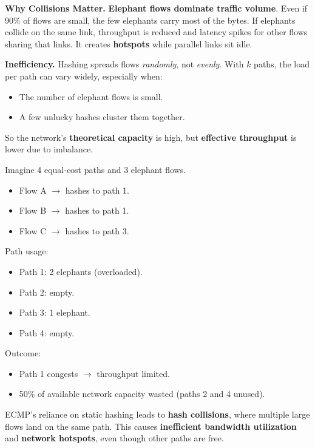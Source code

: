 \newpage

\noindent
\textcolor{Red2}{ \textbf{Why Collisions Matter.}} \textbf{Elephant flows dominate traffic volume}. Even if 90\% of flows are small, the few elephants carry most of the bytes. If elephants collide on the same link, throughput is reduced and latency spikes for other flows sharing that links. It creates \textbf{hotspots} while parallel links sit idle.

\highspace
\textcolor{Red2}{ \textbf{Inefficiency.}} Hashing spreads flows \emph{randomly}, not \emph{evenly}. With $k$ paths, the load per path can vary widely, especially when:
\begin{itemize}
    \item The number of elephant flows is small.
    \item A few unlucky hashes cluster them together.
\end{itemize}
So the network's \textbf{theoretical capacity} is high, but \textbf{effective throughput} is lower due to imbalance.

\begin{examplebox}
    Imagine 4 equal-cost paths and 3 elephant flows.
    \begin{itemize}
        \item Flow A $\rightarrow$ hashes to path 1.
        \item Flow B $\rightarrow$ hashes to path 1.
        \item Flow C $\rightarrow$ hashes to path 3.
    \end{itemize}
    Path usage:
    \begin{itemize}
        \item Path 1: 2 elephants (overloaded).
        \item Path 2: empty.
        \item Path 3: 1 elephant.
        \item Path 4: empty.
    \end{itemize}
    Outcome:
    \begin{itemize}
        \item Path 1 congests $\rightarrow$ throughput limited.
        \item 50\% of available network capacity wasted (paths 2 and 4 unused).
    \end{itemize}
\end{examplebox}

\noindent
ECMP's reliance on static hashing leads to \textbf{hash collisions}, where multiple large flows land on the same path. This causes \textbf{inefficient bandwidth utilization} and \textbf{network hotspots}, even though other paths are free.

